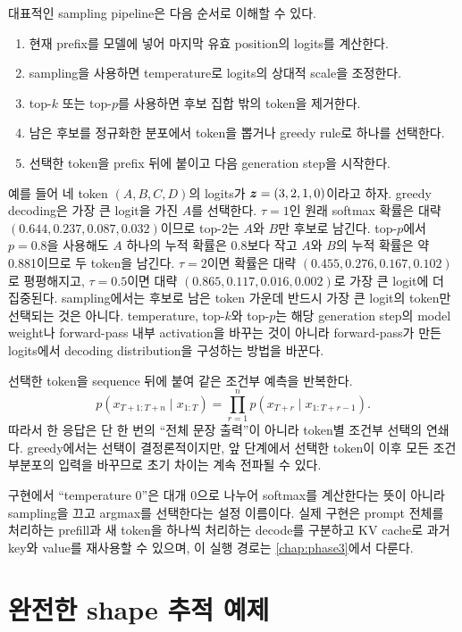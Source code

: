 대표적인 sampling pipeline은 다음 순서로 이해할 수 있다.

\begin{enumerate}
  \item 현재 prefix를 모델에 넣어 마지막 유효 position의 logits를 계산한다.
  \item sampling을 사용하면 temperature로 logits의 상대적 scale을 조정한다.
  \item top-$k$ 또는 top-$p$를 사용하면 후보 집합 밖의 token을 제거한다.
  \item 남은 후보를 정규화한 분포에서 token을 뽑거나 greedy rule로 하나를 선택한다.
  \item 선택한 token을 prefix 뒤에 붙이고 다음 generation step을 시작한다.
\end{enumerate}

예를 들어 네 token $(A,B,C,D)$의 logits가 $\bm{z}=(3,2,1,0)$이라고 하자.
greedy decoding은 가장 큰 logit을 가진 $A$를 선택한다.
$\tau=1$인 원래 softmax 확률은 대략 $(0.644,0.237,0.087,0.032)$이므로 top-$2$는 $A$와 $B$만 후보로 남긴다.
top-$p$에서 $p=0.8$을 사용해도 $A$ 하나의 누적 확률은 0.8보다 작고 $A$와 $B$의 누적 확률은 약 0.881이므로 두 token을 남긴다.
$\tau=2$이면 확률은 대략 $(0.455,0.276,0.167,0.102)$로 평평해지고, $\tau=0.5$이면 대략 $(0.865,0.117,0.016,0.002)$로 가장 큰 logit에 더 집중된다.
sampling에서는 후보로 남은 token 가운데 반드시 가장 큰 logit의 token만 선택되는 것은 아니다.
temperature, top-$k$와 top-$p$는 해당 generation step의 model weight나 forward-pass 내부 activation을 바꾸는 것이 아니라 forward-pass가 만든 logits에서 decoding distribution을 구성하는 방법을 바꾼다.

선택한 token을 sequence 뒤에 붙여 같은 조건부 예측을 반복한다.
\begin{equation}
  p(x_{T+1:T+n}\mid x_{1:T})
  =\prod_{r=1}^{n}p(x_{T+r}\mid x_{1:T+r-1}).
\end{equation}
따라서 한 응답은 단 한 번의 ``전체 문장 출력''이 아니라 token별 조건부 선택의 연쇄다.
greedy에서는 선택이 결정론적이지만, 앞 단계에서 선택한 token이 이후 모든 조건부분포의 입력을 바꾸므로 초기 차이는 계속 전파될 수 있다.

구현에서 ``temperature 0''은 대개 0으로 나누어 softmax를 계산한다는 뜻이 아니라 sampling을 끄고 argmax를 선택한다는 설정 이름이다.
실제 구현은 prompt 전체를 처리하는 prefill과 새 token을 하나씩 처리하는 decode를 구분하고 KV cache로 과거 key와 value를 재사용할 수 있으며, 이 실행 경로는 \cref{chap:phase3}에서 다룬다.

\section{완전한 shape 추적 예제}

